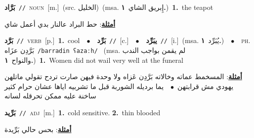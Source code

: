 \documentclass[10pt,a4paper,twoside]{article} %
\begin{document}
\begin{multicols}{2}
{\setlength\topsep{0pt}\textbf{\foreignlanguage{arabic}{بَرَّاد}}\ {\color{gray}\texttt{//}\color{black}}\ \textsc{noun}\ [m.]\ (src. \color{gray}\foreignlanguage{arabic}{الخليل}\color{black})\ \color{gray}(msa. \foreignlanguage{arabic}{إِبريق الشاي}~\foreignlanguage{arabic}{\textbf{١.}})\color{black}\ \textbf{1.}~the teapot\  \begin{flushright}\color{gray}\foreignlanguage{arabic}{\textbf{\underline{\foreignlanguage{arabic}{أمثلة}}}: حط البراد عالنار بدي أعمل شاي}\end{flushright}\color{black}} \vspace{2mm}

{\setlength\topsep{0pt}\textbf{\foreignlanguage{arabic}{بَرَّد}}\ {\color{gray}\texttt{//}\color{black}}\ \textsc{verb}\ [p.]\ \textbf{1.}~cool\ \ $\bullet$\ \ \setlength\topsep{0pt}\textbf{\foreignlanguage{arabic}{بَرِّد}}\ {\color{gray}\texttt{//}\color{black}}\ [c.]\ \ $\bullet$\ \ \setlength\topsep{0pt}\textbf{\foreignlanguage{arabic}{يبَرِّد}}\ {\color{gray}\texttt{//}\color{black}}\ [i.]\ \color{gray}(msa. \foreignlanguage{arabic}{يُبَرِّد}~\foreignlanguage{arabic}{\textbf{١.}})\color{black}\ \ $\bullet$\ \ \textsc{ph.} \color{gray} \foreignlanguage{arabic}{بَرَّدِن عزَاه}\color{black}\ {\color{gray}\texttt{/{\sffamily barradin ʕazaːh}/}\color{black}}\ \color{gray} (msa. \foreignlanguage{arabic}{لم يقمن بواجب الندب والنواح}~\foreignlanguage{arabic}{\textbf{١.}})\color{black}\ \textbf{1.}~Women did not wail very well at the funeral\  \begin{flushright}\color{gray}\foreignlanguage{arabic}{\textbf{\underline{\foreignlanguage{arabic}{أمثلة}}}: المسخمط عماته وخالاته بَرَّدِن عَزاه ولا وحدة فيهن صارت تردح تقولي ماتلهن يهودي مش قرابتهن\ $\bullet$\ \  يما برديله الشوربة قبل ما تشربيه اياها عشان حرام كثير ساخنة عليه ممكن تحرقله لسانه}\end{flushright}\color{black}} \vspace{2mm}

{\setlength\topsep{0pt}\textbf{\foreignlanguage{arabic}{بَرِّيد}}\ {\color{gray}\texttt{//}\color{black}}\ \textsc{adj}\ [m.]\ \textbf{1.}~cold sensitive.  \textbf{2.}~thin blooded\  \begin{flushright}\color{gray}\foreignlanguage{arabic}{\textbf{\underline{\foreignlanguage{arabic}{أمثلة}}}: بحس حالي بَرِّيدة}\end{flushright}\color{black}} \vspace{2mm}


\end{multicols}
\end{document}

